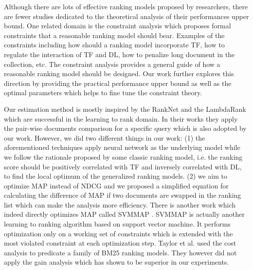 Although there are lots of effective ranking models proposed by researchers, 
there are fewer studies dedicated to the theoretical analysis of their 
performances upper bound. One related domain is the constraint analysis 
\cite{Fang:2004:FSI:1008992.1009004} which proposes formal constraints 
that a reasonable ranking model should bear. Examples of the constraints 
including how should a ranking model incorporate TF, how to regulate 
the interaction of TF and DL, how to penalize long document in the 
collection, etc. The constraint analysis provides a general guide of how 
a reasonable ranking model should be designed. Our work further explores 
this direction by providing the practical performance upper bound as 
well as the optimal parameters which helps to fine tune the constraint 
theory. 

Our estimation method is mostly inspired by the RankNet 
\cite{export:68133,export:132652} and the LambdaRank 
\cite{export:132652,export:81144} which are 
successful in the learning to rank domain. 
In their works they apply the pair-wise documents comparison for a 
specific query which is also adopted by our work.
However, we did two different things in our work: 
(1) the aforementioned techniques apply neural network as the underlying 
model while we follow the rationale proposed by some classic ranking 
model, i.e. the ranking score should be positively correlated with TF and 
inversely correlated with DL, to find the local optimum of the generalized 
ranking models.
(2) we aim to optimize MAP instead of NDCG and we proposed a simplified 
equation for calculating the difference of MAP if two documents are 
swapped in the ranking list which can make the analysis more efficiency. 
There is another work which indeed directly optimizes MAP called SVMMAP 
\cite{Yue:2007:SVM:1277741.1277790}. SVMMAP is actually another learning 
to ranking algorithm based on support vector machine. It performs 
optimization only on a working set of constraints which is extended with 
the most violated constraint at each optimization step. 
Taylor et al. \cite{Taylor:2006:OMR:1183614.1183698} used the cost 
analysis to predicate a family of BM25 ranking models. They however 
did not apply the gain analysis which has shown to be superior in 
our experiments.

